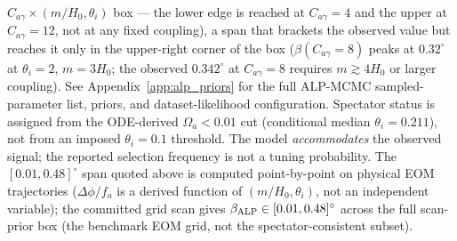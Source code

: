 \documentclass[aps,prd,twocolumn,superscriptaddress,showpacs,preprintnumbers,nofootinbib,longbibliography,floatfix]{revtex4-2}
\begin{document}
$C_{a\gamma}\times(m/H_0,\theta_i)$ box --- the lower edge is reached at
$C_{a\gamma}=4$ and the upper at $C_{a\gamma}=12$, not at any fixed
coupling), a span that brackets the observed value but
reaches it only in the upper-right corner of the box ($\beta(C_{a\gamma}{=}8)$
peaks at $0.32^\circ$ at $\theta_i=2$, $m=3H_0$; the observed
$0.342^\circ$ at $C_{a\gamma}=8$ requires $m\gtrsim 4H_0$ or larger
coupling). See Appendix~\ref{app:alp_priors}
for the full ALP-MCMC sampled-parameter list, priors, and dataset-likelihood
configuration. Spectator status is assigned from the ODE-derived
$\Omega_a<0.01$ cut (conditional median $\theta_i=0.211$), not from an imposed
$\theta_i=0.1$ threshold. The model \textit{accommodates} the observed signal;
the reported selection frequency is not a tuning probability.
The $[0.01,0.48]^\circ$ span quoted above is computed point-by-point on
physical EOM trajectories ($\Delta\phi/f_a$ is a derived function of
$(m/H_0, \theta_i)$, not an independent variable);
the committed grid scan gives $\beta_{\rm ALP}\in[0.01,0.48]^\circ$
across the full scan-prior box (the benchmark EOM grid, not the spectator-consistent subset).
\end{document}
